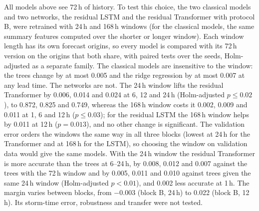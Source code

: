 \documentclass[a4paper,fleqn]{cas-dc}
\begin{document}
All models above see 72\,h of history. To test this choice, the two classical models and two networks, the
residual LSTM and the residual Transformer with protocol B, were retrained with 24\,h and 168\,h windows (for the
classical models, the same summary features computed over the shorter or longer window). Each window length has
its own forecast origins, so every model is compared with its 72\,h version on the origins that both share, with
paired tests over the seeds, Holm-adjusted as a separate family. The classical models are insensitive to the
window: the trees change by at most 0.005 and the ridge regression by at most 0.007 at any lead time. The networks
are not. The 24\,h window lifts the residual Transformer by 0.006, 0.014 and 0.024 at 6, 12 and 24\,h
(Holm-adjusted \(p\le0.02\)), to 0.872, 0.825 and 0.749, whereas the 168\,h window costs it 0.002, 0.009 and 0.011 at
1, 6 and 12\,h (\(p\le0.03\)); for the residual LSTM the 168\,h window helps by 0.011 at 12\,h (\(p=0.013\)), and no other
change is significant. The validation error orders the windows the same way in all three blocks (lowest at 24\,h
for the Transformer and at 168\,h for the LSTM), so choosing the window on validation data would give the same
models. With the 24\,h window the residual Transformer is more accurate than the trees at 6--24\,h, by 0.008, 0.012
and 0.007 against the trees with the 72\,h window and by 0.005, 0.011 and 0.010 against trees given the same 24\,h
window (Holm-adjusted \(p<0.01\)), and 0.002 less accurate at 1\,h. The margin varies between blocks, from
\(-0.003\) (block B, 24\,h) to 0.022 (block B, 12\,h). Its storm-time error, robustness and transfer were not
tested.
\end{document}
